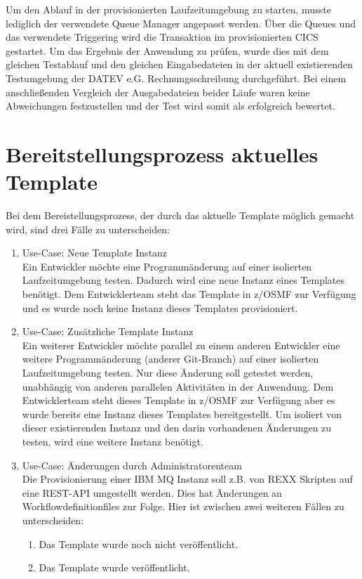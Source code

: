 Um den Ablauf in der provisionierten Laufzeitumgebung zu starten, musste lediglich der verwendete Queue Manager angepasst werden.
Über die Queues und das verwendete Triggering wird die Transaktion im provisionierten CICS gestartet.
Um das Ergebnis der Anwendung zu prüfen, wurde dies mit dem gleichen Testablauf und den gleichen Eingabedateien in der aktuell existierenden Testumgebung der DATEV e.G. Rechnungsschreibung durchgeführt.
Bei einem anschließenden Vergleich der Ausgabedateien beider Läufe waren keine Abweichungen festzustellen und der Test wird somit als erfolgreich bewertet.

\section{Bereitstellungsprozess aktuelles Template}\label{sec:akttemp}
Bei dem Bereistellungsprozess, der durch das aktuelle Template möglich gemacht wird, sind drei Fälle zu unterscheiden:

\begin{samepage}
\begin{enumerate}
\item Use-Case: Neue Template Instanz\\
Ein Entwickler möchte eine Programmänderung auf einer isolierten Laufzeitumgebung testen.
Dadurch wird eine neue Instanz eines Templates benötigt.
Dem Entwicklerteam steht das Template in z/OSMF zur Verfügung und es wurde noch keine Instanz dieses Templates provisioniert.

\item Use-Case: Zusätzliche Template Instanz\\
Ein weiterer Entwickler möchte parallel zu einem anderen Entwickler eine weitere Programmänderung (anderer \glqq Git-Branch\grqq) auf einer isolierten Laufzeitumgebung testen. 
Nur diese Änderung soll getestet werden, unabhängig von anderen parallelen Aktivitäten in der Anwendung. 
Dem Entwicklerteam steht dieses Template in z/OSMF zur Verfügung aber es wurde  bereits eine Instanz dieses Templates bereitgestellt. 
Um isoliert von dieser existierenden Instanz und den darin vorhandenen Änderungen zu testen, wird eine weitere Instanz benötigt.

\item Use-Case: Änderungen durch Administratorenteam\\
Die Provisionierung  einer IBM MQ Instanz soll z.B. von REXX Skripten auf eine REST-API umgestellt werden.
Dies hat Änderungen an Workflowdefinitionfiles zur Folge.
Hier ist zwischen zwei weiteren Fällen zu unterscheiden:
\begin{enumerate}
\item Das Template wurde noch nicht veröffentlicht.
\item Das Template wurde veröffentlicht.
\end{enumerate}
\end{enumerate}
\end{samepage}

